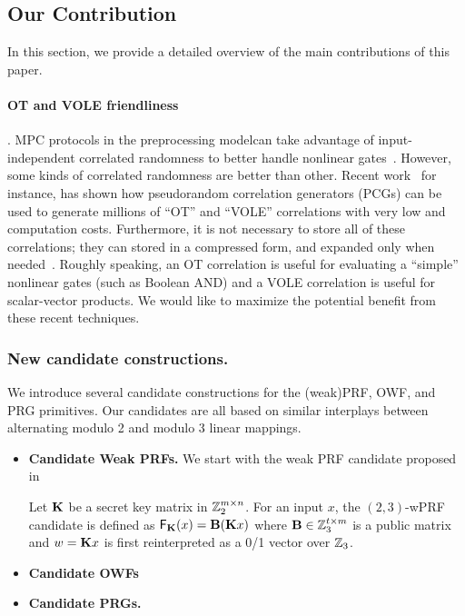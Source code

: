 \subsection{Our Contribution}




In this section, we provide a detailed overview of the main contributions of this paper.


\paragraph{\bf \textnormal{OT} and \textnormal{VOLE} friendliness}.
    MPC protocols in the preprocessing modelcan take advantage of input-independent correlated randomness to better handle nonlinear gates~\cite{Beaver,BDOZ,SPDZ,PowerOfCorrelatedRandomness,TinyTables,BGI19}. However, some kinds of correlated randomness are better than other. Recent work~\cite{?} for instance, has shown how pseudorandom correlation generators (PCGs) can be used to generate millions of ``OT'' and ``VOLE'' correlations with very low and computation costs. Furthermore, it is not necessary to store all of these correlations; they can stored in a compressed form, and expanded only when needed~\cite{?}. Roughly speaking, an OT correlation is useful for evaluating a ``simple'' nonlinear gates (such as Boolean AND) and a VOLE correlation is useful for scalar-vector products. We would like to maximize the potential benefit from these recent techniques.





\subsubsection{New candidate constructions.}
We introduce several candidate constructions for the (weak)PRF, OWF, and PRG primitives. Our candidates are all based on similar interplays between alternating modulo 2 and modulo 3 linear mappings.

\begin{itemize}
    \item \textbf{Candidate Weak PRFs.}
    We start with the weak PRF candidate proposed in~\cite{boneh2018-darkmatter}

    Let $\mat{K}$ be a secret key matrix in $\mathbb{Z}_2^{m \times n}$. For an input $x$, the $(2,3)$-wPRF candidate is defined as $\mathsf{F}_\mat{K}(x) = \mat{B}(\mat{K}x)$ where $\mat{B} \in \Z_3^{t \times m}$ is a public matrix and $w = \mat{K}x$ is first reinterpreted as a 0/1 vector over $\mathbb{Z}_3$.


    \item \textbf{Candidate OWFs}

    \item \textbf{Candidate PRGs.}

\end{itemize}


